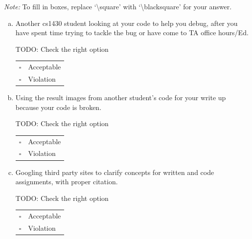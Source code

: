 \documentclass[11pt]{article}
\begin{document}
\emph{Note:} To fill in boxes, replace `\textbackslash square' with `\textbackslash blacksquare' for your answer.

\begin{enumerate}[(a)]
\item
Another cs1430 student looking at your code to help you debug, after you have spent time trying to tackle the bug or have come to TA office hours/Ed.

\begin{tcolorbox}[colback=white!5!white,colframe=green!75!black]
TODO: Check the right option

\begin{tabular}[h]{ll}
$\square$ & Acceptable \\
$\square$ & Violation \\
\end{tabular}
\end{tcolorbox}

\item
Using the result images from another student's code for your write up because your code is broken.

\begin{tcolorbox}[colback=white!5!white,colframe=green!75!black]
TODO: Check the right option

\begin{tabular}[h]{ll}
$\square$ & Acceptable \\
$\square$ & Violation \\
\end{tabular}
\end{tcolorbox}

\item
Googling third party sites to clarify concepts for written and code assignments, with proper citation.

\begin{tcolorbox}[colback=white!5!white,colframe=green!75!black]
TODO: Check the right option

\begin{tabular}[h]{ll}
$\square$ & Acceptable \\
$\square$ & Violation \\
\end{tabular}
\end{tcolorbox}


\end{enumerate}
\end{document}
